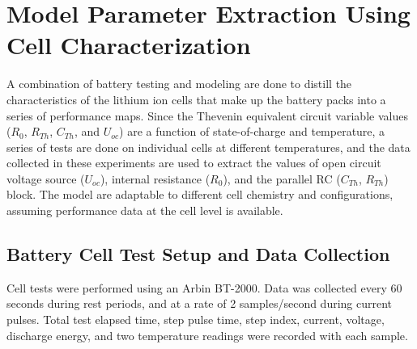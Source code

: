 \documentclass[]{aiaa-tc}%
\begin{document}

\section{Model Parameter Extraction Using Cell Characterization}

A combination of battery testing and modeling are done to distill the characteristics of the lithium ion cells that make up the battery packs into a series of performance maps. Since the Thevenin equivalent circuit variable values ($R_{0}$, $R_{Th}$, $C_{Th}$, and $U_{oc}$) are a function of state-of-charge and temperature, a series of tests are done on individual cells at different temperatures, and the data collected in these experiments are used to extract the values of open circuit voltage source ($U_{oc}$), internal resistance ($R_{0}$), and the parallel RC ($C_{Th}$, $R_{Th}$) block. The model are adaptable to different cell chemistry and configurations, assuming performance data at the cell level is available.



\subsection{Battery Cell Test Setup and Data Collection}

Cell tests were performed using an Arbin BT-2000. Data was collected every 60 seconds during rest periods, and at a rate of 2 samples/second during current pulses. Total test elapsed time, step pulse time, step index, current, voltage, discharge energy, and two temperature readings were recorded with each sample. 
\end{document}
